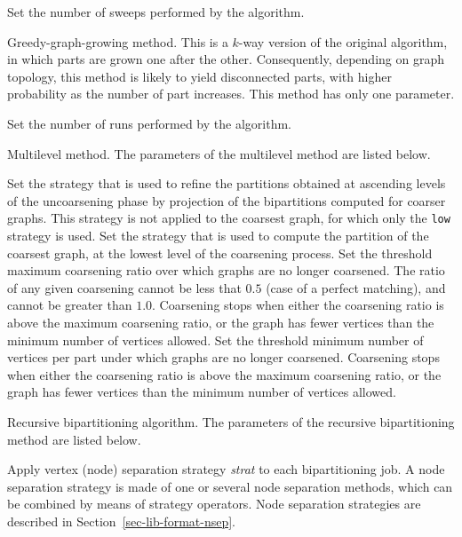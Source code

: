 \begin{itemize}
\begin{itemize}
\iteme[{\tt pass=}{\it nbr}]
Set the number of sweeps performed by the algorithm.
\end{itemize}
\iteme[{\tt h}]
Greedy-graph-growing method. This is a $k$-way version of the
original algorithm, in which parts are grown one after the
other. Consequently, depending on graph topology, this method is
likely to yield disconnected parts, with higher probability as the
number of part increases. This method has only one parameter.
\begin{itemize}
\iteme[{\tt pass=}{\it nbr}]
Set the number of runs performed by the algorithm.
\end{itemize}
\iteme[{\tt m}]
Multilevel method. The parameters of the multilevel method are listed below.
\begin{itemize}
\iteme[{\tt asc=}{\it strat}]
Set the strategy that is used to refine the partitions obtained
at ascending levels of the uncoarsening phase by projection of the
bipartitions computed for coarser graphs.
This strategy is not applied to the coarsest graph, for which only the
{\tt low} strategy is used.
\iteme[{\tt low=}{\it strat}]
Set the strategy that is used to compute the partition of the
coarsest graph, at the lowest level of the coarsening process.
\iteme[{\tt rat=}{\it rat}]
Set the threshold maximum coarsening ratio over which graphs are no longer
coarsened. The ratio of any given coarsening cannot be less that $0.5$
(case of a perfect matching), and cannot be greater than $1.0$.
Coarsening stops when either the coarsening ratio is above the maximum
coarsening ratio, or the graph has fewer vertices than the minimum number of
vertices allowed.
\iteme[{\tt vert=}{\it nbr}]
Set the threshold minimum number of vertices per part under which
graphs are no longer coarsened. Coarsening stops when either the
coarsening ratio is above the maximum coarsening ratio, or the graph
has fewer vertices than the minimum number of vertices allowed.
\end{itemize}
\iteme[{\tt r}]
Recursive bipartitioning algorithm. The parameters of the recursive
bipartitioning method are listed below.
\begin{itemize}
\iteme[{\tt sep=}{\it strat}]
Apply vertex (node) separation strategy {\it strat\/} to each
bipartitioning job. A node separation strategy is made of one or
several node separation methods, which can be combined by means of
strategy operators. Node separation strategies are described in
Section~\ref{sec-lib-format-nsep}.
\end{itemize}
\end{itemize}

